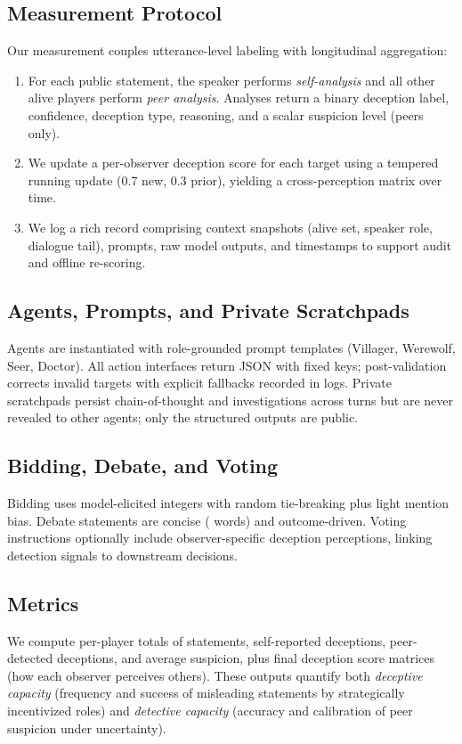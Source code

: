 \documentclass[12pt]{article}
\begin{document}
\subsection{Measurement Protocol}
Our measurement couples utterance-level labeling with longitudinal aggregation:
\begin{enumerate}
    \item For each public statement, the speaker performs \emph{self-analysis} and all other alive players perform \emph{peer analysis}. Analyses return a binary deception label, confidence, deception type, reasoning, and a scalar suspicion level (peers only).
    \item We update a per-observer deception score for each target using a tempered running update (0.7 new, 0.3 prior), yielding a cross-perception matrix over time.
    \item We log a rich record comprising context snapshots (alive set, speaker role, dialogue tail), prompts, raw model outputs, and timestamps to support audit and offline re-scoring.
\end{enumerate}

\subsection{Agents, Prompts, and Private Scratchpads}
Agents are instantiated with role-grounded prompt templates (Villager, Werewolf, Seer, Doctor). All action interfaces return JSON with fixed keys; post-validation corrects invalid targets with explicit fallbacks recorded in logs. Private scratchpads persist chain-of-thought and investigations across turns but are never revealed to other agents; only the structured outputs are public.

\subsection{Bidding, Debate, and Voting}
Bidding uses model-elicited integers with random tie-breaking plus light mention bias. Debate statements are concise ( words) and outcome-driven. Voting instructions optionally include observer-specific deception perceptions, linking detection signals to downstream decisions.

\subsection{Metrics}
We compute per-player totals of statements, self-reported deceptions, peer-detected deceptions, and average suspicion, plus final deception score matrices (how each observer perceives others). These outputs quantify both \emph{deceptive capacity} (frequency and success of misleading statements by strategically incentivized roles) and \emph{detective capacity} (accuracy and calibration of peer suspicion under uncertainty).
\end{document}
